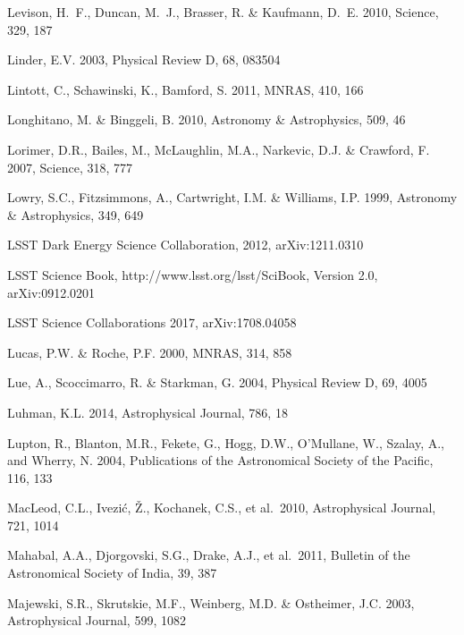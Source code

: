 \documentclass[twocolumn]{aastex61}
\begin{document}
\begin{thebibliography}{}
 Levison, H.~F., Duncan, M.~J., Brasser, R. \& Kaufmann, D.~E. 2010, Science, 329, 187

 Linder, E.V. 2003, Physical Review D, 68, 083504

 Lintott, C., Schawinski, K., Bamford, S. 2011, MNRAS, 410, 166

 Longhitano, M. \& Binggeli, B. 2010, Astronomy \& Astrophysics, 509, 46

 Lorimer, D.R., Bailes, M., McLaughlin, M.A., Narkevic, D.J. \& Crawford, F. 2007, Science, 318, 777

 Lowry, S.C., Fitzsimmons, A., Cartwright, I.M. \& Williams, I.P. 1999, Astronomy \& Astrophysics, 349, 649

 LSST Dark Energy Science Collaboration, 2012, arXiv:1211.0310

 LSST Science Book, http://www.lsst.org/lsst/SciBook,  Version 2.0, arXiv:0912.0201

 LSST Science Collaborations 2017, arXiv:1708.04058

 Lucas, P.W. \& Roche, P.F. 2000, MNRAS, 314, 858

 Lue, A., Scoccimarro, R. \& Starkman, G. 2004, Physical Review D, 69, 4005

 Luhman, K.L. 2014,  Astrophysical Journal, 786, 18

 Lupton, R., Blanton, M.R., Fekete, G., Hogg, D.W., O'Mullane, W., Szalay, A., and Wherry, N. 2004, Publications of the Astronomical Society of the Pacific, 116, 133

 MacLeod, C.L., Ivezi\'{c}, \v{Z}., Kochanek, C.S., et al.~2010, Astrophysical Journal, 721, 1014

 Mahabal, A.A., Djorgovski, S.G., Drake, A.J., et al.~2011, Bulletin of the Astronomical Society of India, 39, 387

 Majewski, S.R., Skrutskie, M.F., Weinberg, M.D. \& Ostheimer, J.C. 2003, Astrophysical Journal, 599, 1082


\end{thebibliography}
\end{document}

